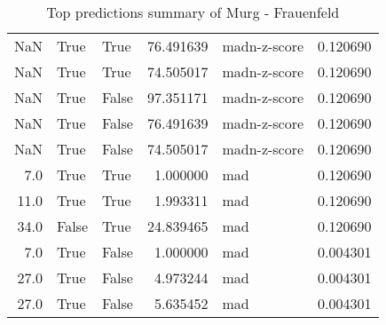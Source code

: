 \begin{table}[H]
\begin{tabular}{rllrlr}
         NaN &           True &        True &  76.491639 & madn-z-score &  0.120690 \\
         NaN &           True &        True &  74.505017 & madn-z-score &  0.120690 \\
         NaN &           True &       False &  97.351171 & madn-z-score &  0.120690 \\
         NaN &           True &       False &  76.491639 & madn-z-score &  0.120690 \\
         NaN &           True &       False &  74.505017 & madn-z-score &  0.120690 \\
         7.0 &           True &        True &   1.000000 &          mad &  0.120690 \\
        11.0 &           True &        True &   1.993311 &          mad &  0.120690 \\
        34.0 &          False &        True &  24.839465 &          mad &  0.120690 \\
         7.0 &           True &       False &   1.000000 &          mad &  0.004301 \\
        27.0 &           True &       False &   4.973244 &          mad &  0.004301 \\
        27.0 &           True &       False &   5.635452 &          mad &  0.004301 \\
\bottomrule
\end{tabular}
\caption{Top predictions summary of Murg - Frauenfeld}
\label{table:2386-ch-top-predictions-summary}
\end{table}
